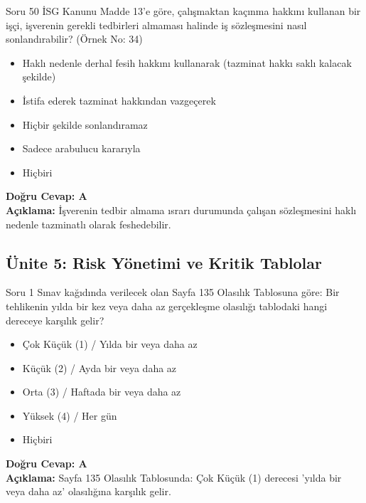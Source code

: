 \documentclass[12pt,a4paper]{article}
\begin{document}
\begin{testcard}{Soru 50}
    İSG Kanunu Madde 13'e göre, çalışmaktan kaçınma hakkını kullanan bir işçi, işverenin gerekli tedbirleri almaması halinde iş sözleşmesini nasıl sonlandırabilir? (Örnek No: 34)
    \begin{itemize}
        \item[A)] Haklı nedenle derhal fesih hakkını kullanarak (tazminat hakkı saklı kalacak şekilde)
        \item[B)] İstifa ederek tazminat hakkından vazgeçerek
        \item[C)] Hiçbir şekilde sonlandıramaz
        \item[D)] Sadece arabulucu kararıyla
        \item[E)] Hiçbiri
    \end{itemize}
    \tcblower
    \textbf{Doğru Cevap: A} \\
    \textbf{Açıklama:} İşverenin tedbir almama ısrarı durumunda çalışan sözleşmesini haklı nedenle tazminatlı olarak feshedebilir.
\end{testcard}

\subsection{Ünite 5: Risk Yönetimi ve Kritik Tablolar}
\begin{testcard}{Soru 1}
    Sınav kağıdında verilecek olan Sayfa 135 Olasılık Tablosuna göre: Bir tehlikenin yılda bir kez veya daha az gerçekleşme olasılığı tablodaki hangi dereceye karşılık gelir?
    \begin{itemize}
        \item[A)] Çok Küçük (1) / Yılda bir veya daha az
        \item[B)] Küçük (2) / Ayda bir veya daha az
        \item[C)] Orta (3) / Haftada bir veya daha az
        \item[D)] Yüksek (4) / Her gün
        \item[E)] Hiçbiri
    \end{itemize}
    \tcblower
    \textbf{Doğru Cevap: A} \\
    \textbf{Açıklama:} Sayfa 135 Olasılık Tablosunda: Çok Küçük (1) derecesi 'yılda bir veya daha az' olasılığına karşılık gelir.
\end{testcard}
\end{document}
